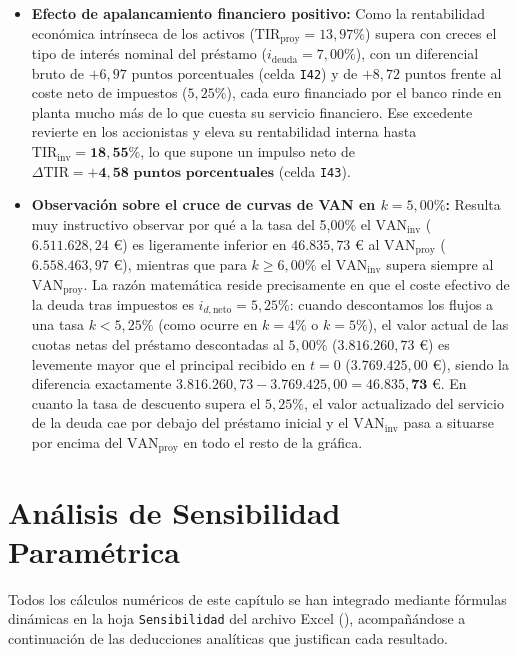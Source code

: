 \documentclass[a4paper,11pt]{report}
\providecommand{\euro}{€}
\begin{document}
\begin{itemize}
\begin{equation}
    \end{equation}
    \item \textbf{Efecto de apalancamiento financiero positivo:} Como la rentabilidad económica intrínseca de los activos ($\text{TIR}_{\text{proy}} = 13,97\%$) supera con creces el tipo de interés nominal del préstamo ($i_{\text{deuda}} = 7,00\%$), con un diferencial bruto de $+6,97\text{ puntos porcentuales}$ (celda \texttt{I42}) y de $+8,72\text{ puntos}$ frente al coste neto de impuestos ($5,25\%$), cada euro financiado por el banco rinde en planta mucho más de lo que cuesta su servicio financiero. Ese excedente revierte en los accionistas y eleva su rentabilidad interna hasta $\text{TIR}_{\text{inv}} = \mathbf{18,55\%}$, lo que supone un impulso neto de $\Delta\text{TIR} = \mathbf{+4,58\text{ puntos porcentuales}}$ (celda \texttt{I43}).
    \item \textbf{Observación sobre el cruce de curvas de VAN en $k = 5,00\%$:} Resulta muy instructivo observar por qué a la tasa del 5,00\% el $\text{VAN}_{\text{inv}}$ ($6.511.628,24\text{ \euro}$) es ligeramente inferior en $46.835,73\text{ \euro}$ al $\text{VAN}_{\text{proy}}$ ($6.558.463,97\text{ \euro}$), mientras que para $k \ge 6,00\%$ el $\text{VAN}_{\text{inv}}$ supera siempre al $\text{VAN}_{\text{proy}}$. La razón matemática reside precisamente en que el coste efectivo de la deuda tras impuestos es $i_{d,\text{neto}} = 5,25\%$: cuando descontamos los flujos a una tasa $k < 5,25\%$ (como ocurre en $k = 4\%$ o $k = 5\%$), el valor actual de las cuotas netas del préstamo descontadas al $5,00\%$ ($3.816.260,73\text{ \euro}$) es levemente mayor que el principal recibido en $t=0$ ($3.769.425,00\text{ \euro}$), siendo la diferencia exactamente $3.816.260,73 - 3.769.425,00 = \mathbf{46.835,73\text{ \euro}}$. En cuanto la tasa de descuento supera el $5,25\%$, el valor actualizado del servicio de la deuda cae por debajo del préstamo inicial y el $\text{VAN}_{\text{inv}}$ pasa a situarse por encima del $\text{VAN}_{\text{proy}}$ en todo el resto de la gráfica.
\end{itemize}

\chapter{Análisis de Sensibilidad Paramétrica}

Todos los cálculos numéricos de este capítulo se han integrado mediante fórmulas dinámicas en la hoja \texttt{Sensibilidad} del archivo Excel (), acompañándose a continuación de las deducciones analíticas que justifican cada resultado.
\end{document}
